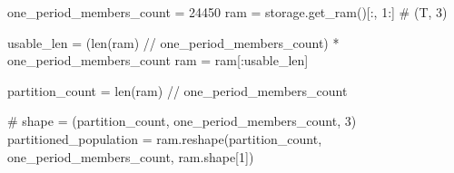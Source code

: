 one\_period\_members\_count = 24450
ram = storage.get\_ram()[:, 1:]  # (T, 3)

usable\_len = (len(ram) // one\_period\_members\_count) * one\_period\_members\_count
ram = ram[:usable\_len]

partition\_count = len(ram) // one\_period\_members\_count

# shape = (partition\_count, one\_period\_members\_count, 3)
partitioned\_population = ram.reshape(partition\_count, one\_period\_members\_count, ram.shape[1])